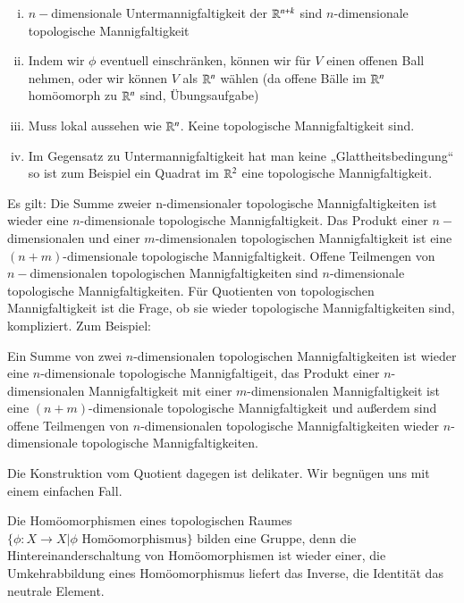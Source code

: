 \documentclass[a4paper,10pt]{scrartcl}
\begin{document}
\begin{note*}
 \begin{enumerate}[(i)]
  \item $n-$dimensionale Untermannigfaltigkeit der $\mathbb{R}^{n+k}$ sind $n$-dimensionale topologische Mannigfaltigkeit
  \item Indem wir $\phi$ eventuell einschränken, können wir für $V$ einen offenen Ball nehmen, oder wir können $V$ als $\mathbb{R}^n$ wählen (da offene Bälle im $\mathbb{R}^n$ homöomorph zu $\mathbb{R}^n$ sind, Übungsaufgabe)
  \item Muss lokal aussehen wie $\mathbb{R}^n$. Keine topologische Mannigfaltigkeit sind.
\begin{figure}[H]
\centering
 
\caption{}
\end{figure}
\item Im Gegensatz zu Untermannigfaltigkeit hat man keine „Glattheitsbedingung“ so ist zum Beispiel ein Quadrat im $\mathbb{R}^2$ eine topologische Mannigfaltigkeit.
 \end{enumerate}
\end{note*}
Es gilt: Die Summe zweier n-dimensionaler topologische Mannigfaltigkeiten ist wieder eine $n$-dimensionale topologische Mannigfaltigkeit. Das Produkt einer $n-$dimensionalen und einer $m$-dimensionalen topologischen Mannigfaltigkeit ist eine $(n+m)$-dimensionale topologische Mannigfaltigkeit.  Offene Teilmengen von $n-$dimensionalen topologischen Mannigfaltigkeiten sind $n$-dimensionale topologische Mannigfaltigkeiten. Für Quotienten von topologischen Mannigfaltigkeit ist die Frage, ob sie wieder topologische Mannigfaltigkeiten sind, kompliziert.
Zum Beispiel:
\begin{figure}[H]
\centering
 
\caption{}
\end{figure}
Ein Summe von zwei $n$-dimensionalen topologischen Mannigfaltigkeiten ist wieder eine $n$-dimensionale topologische Mannigfaltigeit, das Produkt einer $n$-dimensionalen Mannigfaltigkeit mit einer $m$-dimensionalen Mannigfaltigkeit ist eine $(n+ m)$-dimensionale topologische Mannigfaltigkeit und außerdem sind offene Teilmengen von $n$-dimensionalen topologische Mannigfaltigkeiten wieder $n$-dimensionale topologische Mannigfaltigkeiten.  

Die Konstruktion vom Quotient dagegen ist delikater. Wir begnügen uns mit einem einfachen Fall.

Die Homöomorphismen eines topologischen Raumes $\{\phi: X\to X|\phi \text{ Homöomorphismus}\}$ bilden eine Gruppe, denn die Hintereinanderschaltung von Homöomorphismen ist wieder einer, die Umkehrabbildung eines Homöomorphismus liefert das Inverse, die Identität das neutrale Element.
\end{document}
